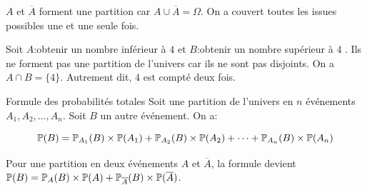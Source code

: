 \documentclass[10pt,a4paper,openany,twoside]{book}
\begin{document}
\begin{ex}{}{}
  $A$ et $\overline{A}$ forment une partition car $A\cup \overline{A} = \Omega$. On a couvert toutes les issues possibles une et une seule fois.

  Soit $A$:\og obtenir un nombre inférieur à $4$ \fg{} et $B$:\og obtenir un nombre supérieur à $4$ \fg{}. Ils ne forment pas une partition de l'univers car ils ne sont pas disjoints. On a $A \cap B = \{4\}$. Autrement dit, $4$ est compté deux fois.
\end{ex}

\begin{theo}{Formule des probabilités totales}{}
  Soit une partition de l'univers en $n$ événements $A_1, A_2, \dots, A_n$. Soit $B$ un autre événement. On a:

  $$\P(B) = \P_{A_1}(B)\times \P(A_1) + \P_{A_2}(B)\times \P(A_2) + \dots + \P_{A_n}(B)\times \P(A_n)$$
\end{theo}

\begin{ex}{}{}
  Pour une partition en deux événements $A$ et $\overline{A}$, la formule devient $\P(B) = \P_{A}(B)\times \P(A) + \P_{\overline{A}}(B)\times \P(\overline{A})$.
\end{ex}
\end{document}
